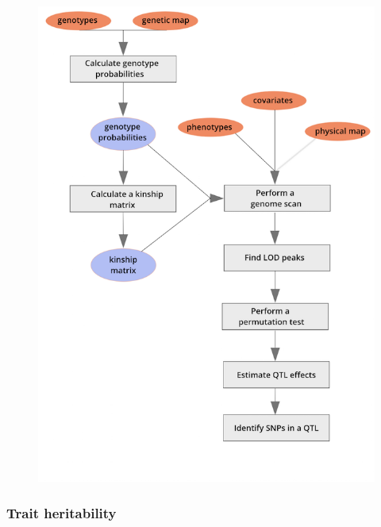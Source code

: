 \documentclass[]{article}
\begin{document}
\begin{figure}
\centering
\includegraphics{../figs/mapping-workflow.png}
\caption{}
\end{figure}

\subsubsection{Trait heritability}\label{trait-heritability}
\end{document}
